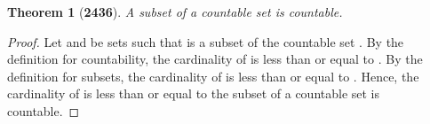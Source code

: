 \documentclass[preview]{standalone}
\newtheorem{theorem}{Theorem}
\begin{document}
\begin{theorem}[\textbf{2436}]
    A subset of a countable set is countable.
\end{theorem}

\begin{proof}
    Let  and \bm{$\Lambda$} be sets such that 
     is a subset of the countable set \bm{$\Lambda$}. 
    By the definition for countability,
    the cardinality of \bm{$\Lambda$} is less than or equal to . 
    By the definition for subsets, 
    the cardinality of 
    is less than or equal to \bm{$\Lambda$}.
    Hence,
    the cardinality of  is less than or equal to 
    \bm{$\therefore$} the subset of a countable set is countable.
\end{proof}
\end{document}
